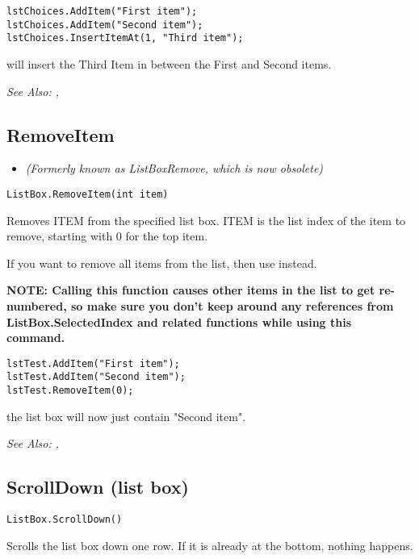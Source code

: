 \begin{verbatim}
lstChoices.AddItem("First item");
lstChoices.AddItem("Second item");
lstChoices.InsertItemAt(1, "Third item");
\end{verbatim}
will insert the Third Item in between the First and Second items.

\it{See Also:} ,


\subsection{RemoveItem}\label{ListBox.RemoveItem}%

\begin{itemize}
\item \it{(Formerly known as ListBoxRemove, which is now obsolete)}
\end{itemize}

\begin{verbatim}
ListBox.RemoveItem(int item)
\end{verbatim}
Removes ITEM from the specified list box. ITEM is the list index of the item to
remove, starting with 0 for the top item.

If you want to remove all items from the list, then use 
instead.

\bf{NOTE:} Calling this function causes other items in the list to get re-numbered, so
make sure you don't keep around any references from ListBox.SelectedIndex and related functions
while using this command.

\begin{verbatim}
lstTest.AddItem("First item");
lstTest.AddItem("Second item");
lstTest.RemoveItem(0);
\end{verbatim}
the list box will now just contain "Second item".

\it{See Also:} , 


\subsection{ScrollDown (list box)}\label{ListBox.ScrollDown}%

\begin{verbatim}
ListBox.ScrollDown()
\end{verbatim}
Scrolls the list box down one row. If it is already at the bottom, nothing happens.

